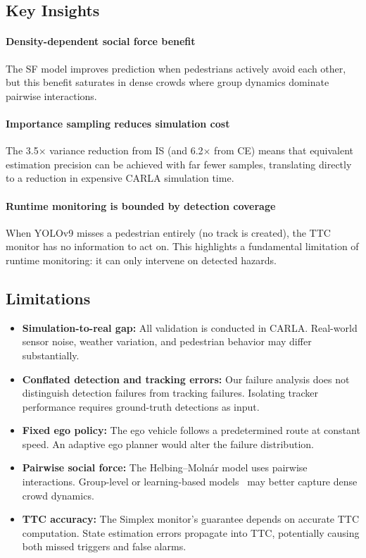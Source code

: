 \documentclass[conference]{IEEEtran}
\begin{document}
\subsection{Key Insights}

\paragraph{Density-dependent social force benefit}
The SF model improves prediction when pedestrians actively avoid each other, but this benefit saturates in dense crowds where group dynamics dominate pairwise interactions.

\paragraph{Importance sampling reduces simulation cost}
The 3.5$\times$ variance reduction from IS (and 6.2$\times$ from CE) means that equivalent estimation precision can be achieved with far fewer samples, translating directly to a reduction in expensive CARLA simulation time.

\paragraph{Runtime monitoring is bounded by detection coverage}
When YOLOv9 misses a pedestrian entirely (no track is created), the TTC monitor has no information to act on. This highlights a fundamental limitation of runtime monitoring: it can only intervene on detected hazards.

\subsection{Limitations}

\begin{itemize}
    \item \textbf{Simulation-to-real gap:} All validation is conducted in CARLA. Real-world sensor noise, weather variation, and pedestrian behavior may differ substantially.
    \item \textbf{Conflated detection and tracking errors:} Our failure analysis does not distinguish detection failures from tracking failures. Isolating tracker performance requires ground-truth detections as input.
    \item \textbf{Fixed ego policy:} The ego vehicle follows a predetermined route at constant speed. An adaptive ego planner would alter the failure distribution.
    \item \textbf{Pairwise social force:} The Helbing--Moln\'{a}r model uses pairwise interactions. Group-level or learning-based models~\cite{alahi2016social} may better capture dense crowd dynamics.
    \item \textbf{TTC accuracy:} The Simplex monitor's guarantee depends on accurate TTC computation. State estimation errors propagate into TTC, potentially causing both missed triggers and false alarms.
\end{itemize}
\end{document}

